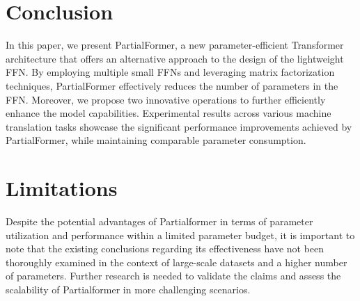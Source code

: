 \documentclass[11pt]{article}
\begin{document}
\section{Conclusion}

In this paper, we present PartialFormer, a new parameter-efficient Transformer architecture that offers an alternative approach to the design of the lightweight FFN. By employing multiple small FFNs and leveraging matrix factorization techniques, PartialFormer effectively reduces the number of parameters in the FFN. Moreover, we propose two innovative operations to further efficiently enhance the model capabilities. Experimental results across various machine translation tasks showcase the significant performance improvements achieved by PartialFormer, while maintaining comparable parameter consumption. 


 



\section*{Limitations}

Despite the potential advantages of Partialformer in terms of parameter utilization and performance within a limited parameter budget, it is important to note that the existing conclusions regarding its effectiveness have not been thoroughly examined in the context of large-scale datasets and a higher number of parameters. Further research is needed to validate the claims and assess the scalability of Partialformer in more challenging scenarios.
\end{document}
